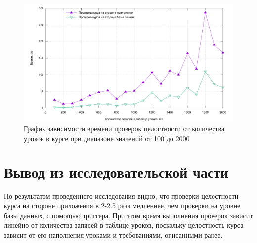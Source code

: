 \begin{figure}[H]
	\centering
	\includegraphics[height=0.35\textheight]{inc/img/plot2.pdf}
	\caption{График зависимости времени проверок целостности от количества уроков в курсе при диапазоне значений от 100 до 2000}
	\label{img:plot2}
\end{figure}

\section{Вывод из исследовательской части}

По результатом проведенного исследования видно, что проверки целостности курса на стороне приложения в 2-2.5 раза медленнее, чем проверки на уровне базы данных, с помощью триггера. При этом время выполнения проверок зависит линейно от количества записей в таблице уроков, поскольку целостность курса зависит от его наполнения уроками и требованиями, описанными ранее. 
